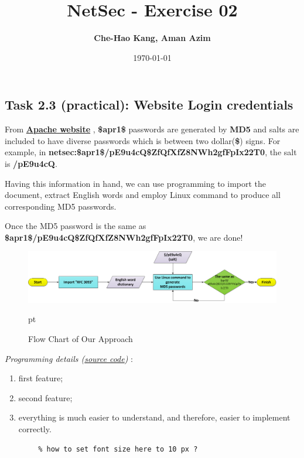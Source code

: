 \documentclass[10pt,a4paper]{article}
\title{NetSec - Exercise 02} %
\author{\textbf{Che-Hao Kang, Aman Azim}} %
\date{\today}
\begin{document}
 
\maketitle 

\subsection*{Task 2.3 (practical): Website Login credentials}
From \textbf{\href{https://httpd.apache.org/docs/2.4/misc/password\_encryptions.html}{Apache website}} , \textbf{\$apr1\$} passwords are generated by \textbf{MD5} and salts are included to have diverse passwords which is between two dollar(\textbf{\$}) signs. For example, in \textbf{netsec:\$apr1\$/pE9u4cQ\$ZfQfXfZ8NWh2gfFpIx22T0}, the salt is \textbf{/pE9u4cQ}.

Having this information in hand, we can use programming to import the document, extract English words and employ Linux command to produce all corresponding MD5 passwords. 

Once the MD5 password is the same as \textbf{\$apr1\$/pE9u4cQ\$ZfQfXfZ8NWh2gfFpIx22T0}, we are done!
  \begin{figure}[h]
    \begin{center}
      \includegraphics[width=1.0\textwidth]{practicalPic}
      \caption{Flow Chart of Our Approach}
       pt
      \label{fig:practicalPic}
    \end{center}
  \end{figure}

\textsl{Programming details (\href{https://goo.gl/hvM4rt}{source code})} :

\begin{enumerate}
\item {first feature;}
\item {second feature;}
\item {everything is much easier to understand, and therefore, easier to implement correctly.}
\end{enumerate}

\begingroup
    \fontsize{10pt}{12pt}\selectfont
    \begin{verbatim}  
        % how to set font size here to 10 px ?  
    \end{verbatim}  
\endgroup
 
\end{document}
